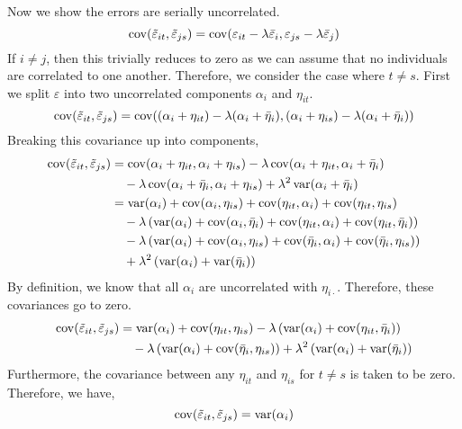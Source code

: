 \documentclass[12pt,twoside]{article}
\begin{document}
\begin{problems}
\begin{problemparts}
Now we show the errors are serially uncorrelated.
$$ \operatorname{cov}(\tilde{\varepsilon}_{it}, \tilde{\varepsilon}_{js}) =
\operatorname{cov}(\varepsilon_{it} - \lambda \bar{\varepsilon}_i, \varepsilon_{js} -
\lambda \bar{\varepsilon}_j) $$
If $i \neq j$, then this trivially reduces to zero as we can assume that no
individuals are correlated to one another. Therefore, we consider the case
where $t \neq s$. First we split $\varepsilon$ into two uncorrelated
components $\alpha_i$ and $\eta_{it}$.
$$ \operatorname{cov}(\tilde{\varepsilon}_{it}, \tilde{\varepsilon}_{js}) = \operatorname{cov}((\alpha_i
+ \eta_{it}) - \lambda (\alpha_i + \bar{\eta}_i), (\alpha_i + \eta_{is}) -
\lambda (\alpha_i + \bar{\eta}_i)) $$
Breaking this covariance up into components,
\begin{align*}
    \operatorname{cov}(\tilde{\varepsilon}_{it}, \tilde{\varepsilon}_{js}) &= \operatorname{cov}(\alpha_i
    + \eta_{it}, \alpha_i + \eta_{is}) - \lambda \operatorname{cov}(\alpha_i + \eta_{it},
    \alpha_i + \bar{\eta}_i) \\
    &\quad - \lambda \operatorname{cov}(\alpha_i + \bar{\eta}_i, \alpha_i + \eta_{is}) +
    \lambda^2 \operatorname{var}(\alpha_i + \bar{\eta}_i) \\
    &= \operatorname{var}(\alpha_i) + \operatorname{cov}(\alpha_i, \eta_{is}) + \operatorname{cov}(\eta_{it}, \alpha_i)
    + \operatorname{cov}(\eta_{it}, \eta_{is}) \\
    &\quad - \lambda\left(\operatorname{var}(\alpha_i) + \operatorname{cov}(\alpha_i, \bar{\eta}_i) +
    \operatorname{cov}(\eta_{it}, \alpha_i) + \operatorname{cov}(\eta_{it}, \bar{\eta}_i)\right) \\
    &\quad - \lambda\left(\operatorname{var}(\alpha_i) + \operatorname{cov}(\alpha_i, \eta_{is}) +
    \operatorname{cov}(\bar{\eta}_i, \alpha_i) + \operatorname{cov}(\bar{\eta}_i, \eta_{is})\right) \\
    &\quad + \lambda^2\left(\operatorname{var}(\alpha_i) + \operatorname{var}(\bar{\eta}_i)\right)
\end{align*}
By definition, we know that all $\alpha_i$ are uncorrelated with
$\eta_{i\cdot}$. Therefore, these covariances go to zero.
\begin{align*}
    \operatorname{cov}(\tilde{\varepsilon}_{it}, \tilde{\varepsilon}_{js}) &=
    \operatorname{var}(\alpha_i) + \operatorname{cov}(\eta_{it}, \eta_{is}) - \lambda\left(\operatorname{var}(\alpha_i)
    + \operatorname{cov}(\eta_{it}, \bar{\eta}_i)\right) \\
    &\quad - \lambda\left(\operatorname{var}(\alpha_i) + \operatorname{cov}(\bar{\eta}_i,
    \eta_{is})\right) + \lambda^2\left(\operatorname{var}(\alpha_i) +
    \operatorname{var}(\bar{\eta}_i)\right) \\
\end{align*}
Furthermore, the covariance between any $\eta_{it}$ and $\eta_{is}$ for $t
\neq s$ is taken to be zero. Therefore, we have,
$$ \operatorname{cov}(\tilde{\varepsilon}_{it}, \tilde{\varepsilon}_{js}) = \operatorname{var}(\alpha_i)
$$
\end{problemparts}
\end{problems}
\end{document}
